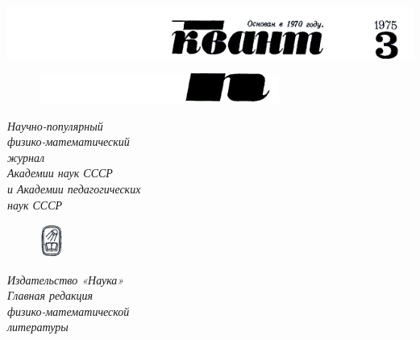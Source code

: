 \documentclass[10pt,a4paper]{article}
\begin{document}
\hspace*{-1cm} \includegraphics{lt1}
\vspace*{-1cm}
\begin{figure}
\hspace*{-0.5cm}\includegraphics[width=0.7\textwidth]{lt2}
\end{figure}

\begin{spacing}{0.7}
\vspace*{0.1cm}
\noindent\textit{Научно-популярный\\
физико-математический\\
журнал\\
Академии наук СССР\\
и Академии педагогических\\
наук СССР\\}

\begin{figure}
\centering
\vspace*{-0.6cm}\hspace*{10.6cm}\includegraphics[width=0.07\textwidth]{lt3}
\end{figure}

\noindent\textit{Издательство «Наука»\\
Главная редакция\\
физико-математической\\
литературы\\}
\newline
\newline
\end{spacing}
\vspace*{-0.7cm}
\end{document}
